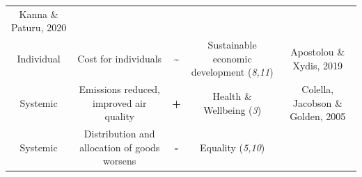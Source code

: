 \documentclass[
]{book}
\begin{document}
\begin{longtable}[]{@{}ccccc@{}}
\begin{minipage}[t]{0.17\columnwidth}
Kanna \& Paturu, 2020\strut
\end{minipage}\tabularnewline
\begin{minipage}[t]{0.17\columnwidth}\centering
Individual\strut
\end{minipage} & \begin{minipage}[t]{0.16\columnwidth}\centering
Cost for individuals\strut
\end{minipage} & \begin{minipage}[t]{0.17\columnwidth}\centering
\textbf{\textasciitilde{}}\strut
\end{minipage} & \begin{minipage}[t]{0.17\columnwidth}\centering
Sustainable economic development (\emph{8,11})\strut
\end{minipage} & \begin{minipage}[t]{0.17\columnwidth}\centering
Apostolou \& Xydis, 2019\strut
\end{minipage}\tabularnewline
\begin{minipage}[t]{0.17\columnwidth}\centering
Systemic\strut
\end{minipage} & \begin{minipage}[t]{0.16\columnwidth}\centering
Emissions reduced, improved air quality\strut
\end{minipage} & \begin{minipage}[t]{0.17\columnwidth}\centering
\textbf{+}\strut
\end{minipage} & \begin{minipage}[t]{0.17\columnwidth}\centering
Health \& Wellbeing (\emph{3})\strut
\end{minipage} & \begin{minipage}[t]{0.17\columnwidth}\centering
Colella, Jacobson \& Golden, 2005\strut
\end{minipage}\tabularnewline
\begin{minipage}[t]{0.17\columnwidth}\centering
Systemic\strut
\end{minipage} & \begin{minipage}[t]{0.16\columnwidth}\centering
Distribution and allocation of goods worsens\strut
\end{minipage} & \begin{minipage}[t]{0.17\columnwidth}\centering
\textbf{-}\strut
\end{minipage} & \begin{minipage}[t]{0.17\columnwidth}\centering
Equality (\emph{5,10})\strut
\end{minipage} & \begin{minipage}[t]{0.17\columnwidth}\centering

\end{minipage}
\end{longtable}
\end{document}
